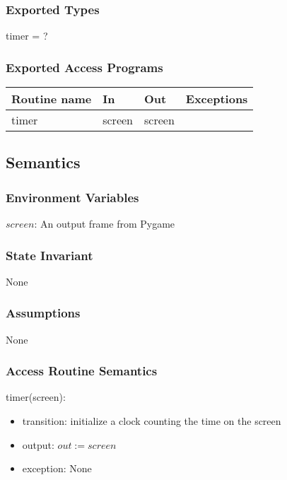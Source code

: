 \documentclass[12pt]{article}
\begin{document}
\subsubsection {Exported Types}

timer = ?

\subsubsection {Exported Access Programs}

\begin{tabular}{| l | l | l | l |}
\hline
\textbf{Routine name} & \textbf{In} & \textbf{Out} & \textbf{Exceptions}\\
\hline
timer & screen & screen & ~\\
\hline
\end{tabular}

\subsection {Semantics}

\subsubsection {Environment Variables}

$screen$: An output frame from Pygame

\subsubsection {State Invariant}

None

\subsubsection {Assumptions}

None

\subsubsection {Access Routine Semantics}

timer(screen):
\begin{itemize}
\item transition: initialize a clock counting the time on the screen
\item output: $out := screen$
\item exception: None
\end{itemize}
\end{document}
